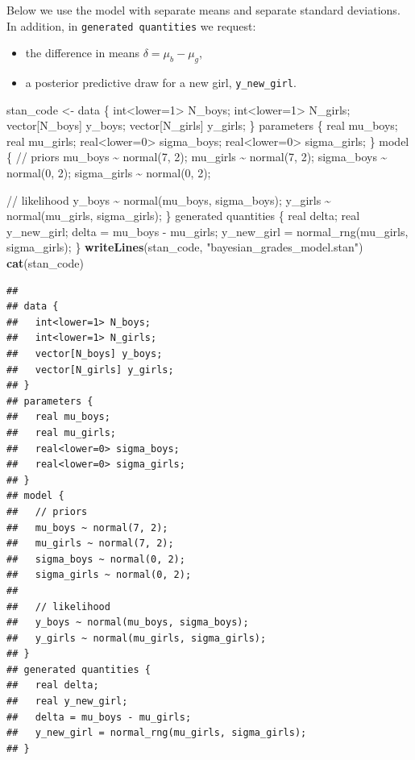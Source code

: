 \documentclass[
  english,
  12pt,
]{article}
\newenvironment{Shaded}{\begin{snugshade}}{\end{snugshade}}
\newcommand{\FunctionTok}[1]{\textcolor[rgb]{0.13,0.29,0.53}{\textbf{#1}}}
\newcommand{\NormalTok}[1]{#1}
\newcommand{\OtherTok}[1]{\textcolor[rgb]{0.56,0.35,0.01}{#1}}
\newcommand{\StringTok}[1]{\textcolor[rgb]{0.31,0.60,0.02}{#1}}
\providecommand{\tightlist}{%
  \setlength{\itemsep}{0pt}\setlength{\parskip}{0pt}}
\begin{document}
Below we use the model with separate means and separate standard
deviations. In addition, in \texttt{generated\ quantities} we request:

\begin{itemize}
\tightlist
\item
  the difference in means \(\delta = \mu_b - \mu_g\),
\item
  a posterior predictive draw for a new girl, \texttt{y\_new\_girl}.
\end{itemize}

\begin{Shaded}
\begin{Highlighting}[]
\NormalTok{stan\_code }\OtherTok{\textless{}{-}} \StringTok{\textquotesingle{}}
\StringTok{data \{}
\StringTok{  int\textless{}lower=1\textgreater{} N\_boys;}
\StringTok{  int\textless{}lower=1\textgreater{} N\_girls;}
\StringTok{  vector[N\_boys] y\_boys;}
\StringTok{  vector[N\_girls] y\_girls;}
\StringTok{\}}
\StringTok{parameters \{}
\StringTok{  real mu\_boys;}
\StringTok{  real mu\_girls;}
\StringTok{  real\textless{}lower=0\textgreater{} sigma\_boys;}
\StringTok{  real\textless{}lower=0\textgreater{} sigma\_girls;}
\StringTok{\}}
\StringTok{model \{}
\StringTok{  // priors}
\StringTok{  mu\_boys \textasciitilde{} normal(7, 2);}
\StringTok{  mu\_girls \textasciitilde{} normal(7, 2);}
\StringTok{  sigma\_boys \textasciitilde{} normal(0, 2);}
\StringTok{  sigma\_girls \textasciitilde{} normal(0, 2);}

\StringTok{  // likelihood}
\StringTok{  y\_boys \textasciitilde{} normal(mu\_boys, sigma\_boys);}
\StringTok{  y\_girls \textasciitilde{} normal(mu\_girls, sigma\_girls);}
\StringTok{\}}
\StringTok{generated quantities \{}
\StringTok{  real delta;}
\StringTok{  real y\_new\_girl;}
\StringTok{  delta = mu\_boys {-} mu\_girls;}
\StringTok{  y\_new\_girl = normal\_rng(mu\_girls, sigma\_girls);}
\StringTok{\}}
\StringTok{\textquotesingle{}}
\FunctionTok{writeLines}\NormalTok{(stan\_code, }\StringTok{"bayesian\_grades\_model.stan"}\NormalTok{)}
\FunctionTok{cat}\NormalTok{(stan\_code)}
\end{Highlighting}
\end{Shaded}

\begin{verbatim}
## 
## data {
##   int<lower=1> N_boys;
##   int<lower=1> N_girls;
##   vector[N_boys] y_boys;
##   vector[N_girls] y_girls;
## }
## parameters {
##   real mu_boys;
##   real mu_girls;
##   real<lower=0> sigma_boys;
##   real<lower=0> sigma_girls;
## }
## model {
##   // priors
##   mu_boys ~ normal(7, 2);
##   mu_girls ~ normal(7, 2);
##   sigma_boys ~ normal(0, 2);
##   sigma_girls ~ normal(0, 2);
## 
##   // likelihood
##   y_boys ~ normal(mu_boys, sigma_boys);
##   y_girls ~ normal(mu_girls, sigma_girls);
## }
## generated quantities {
##   real delta;
##   real y_new_girl;
##   delta = mu_boys - mu_girls;
##   y_new_girl = normal_rng(mu_girls, sigma_girls);
## }
\end{verbatim}
\end{document}
